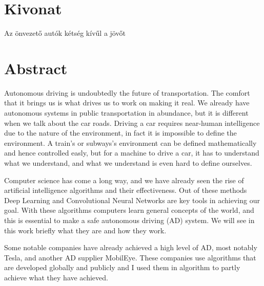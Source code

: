 \setcounter{page}{1}



\selecthungarian

\chapter*{Kivonat}

Az önvezető autók kétség kívűl a jövőt 

\vfill
\selectenglish


\chapter*{Abstract}

Autonomous driving is undoubtedly the future of transportation. The comfort that
it brings us is what drives us to work on making it real. We already have
autonomous systems in public transportation in abundance, but it is different
when we talk about the car roads. Driving a car requires near-human intelligence
due to the nature of the environment, in fact it is impossible to define the
environment. A train's or subways's environment can be defined mathematically
and hence controlled easly, but for a machine to drive a car, it has to
understand what we understand, and what we understand is even hard to define
ourselves.

Computer science has come a long way, and we have already seen the rise of
artificial intelligence algorithms and their effectiveness. Out of these methods
Deep Learning and Convolutional Neural Networks are key tools in achieving our
goal. With these algorithms computers learn general concepts of the world, and
this is essential to make a safe autonomous driving (AD) system. We will see in
this work briefly what they are and how they work. 

Some notable companies have already achieved a high level of AD, most notably
Tesla, and another AD supplier MobilEye. These companies use algorithms that are
developed globally and publicly and I used them in algorithm to partly achieve
what they have achieved. 

